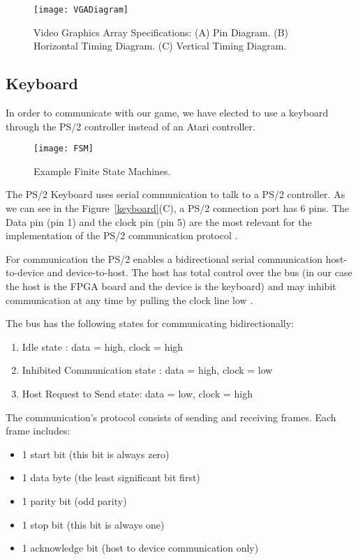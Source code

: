 \documentclass[conference]{IEEEtran}
\begin{document}
\begin{figure*}[!t]
\centering
\texttt{[image: VGADiagram]}
\caption{Video Graphics Array Specifications: (A) Pin Diagram. (B) Horizontal Timing Diagram. (C) Vertical Timing Diagram.}
\label{vga}
\end{figure*}

\subsection{Keyboard}
In order to communicate with our game, we have elected to use a keyboard through the PS/2 controller instead of an Atari controller.


\begin{figure}[!t]
\centering
\texttt{[image: FSM]}
\caption{Example Finite State Machines.}
\label{FSM}
\end{figure}
The PS/2 Keyboard uses serial communication to talk to a PS/2 controller. As we can see in the Figure~\ref{keyboard}(C), a PS/2 connection port has 6 pins. The Data pin (pin 1) and the clock pin (pin 5) are the most relevant for the implementation of the PS/2 communication protocol \cite{Chapweske:2003}.

For communication the PS/2 enables a bidirectional serial communication host-to-device and device-to-host. The host has total control over the bus (in our case the host is the FPGA board and the device is the keyboard) and may inhibit communication at any time by pulling the clock line low \cite{Chapweske:2003}.

The bus has the following states for communicating bidirectionally\cite{Chapweske:2003}:
\begin{enumerate}
\item Idle state : data = high, clock = high
\item Inhibited Communication state : data = high, clock = low
\item Host Request to Send state: data = low, clock = high
\end{enumerate}

The communication’s protocol consists of sending and receiving frames. Each frame includes\cite{Chapweske:2003}:
\begin{itemize}
\item 1 start bit (this bit is always zero)
\item 1 data byte (the least significant bit first)
\item 1 parity bit (odd parity)
\item 1 stop bit (this bit is always one)
\item 1 acknowledge bit (host to device communication only)
\end{itemize}
\end{document}
